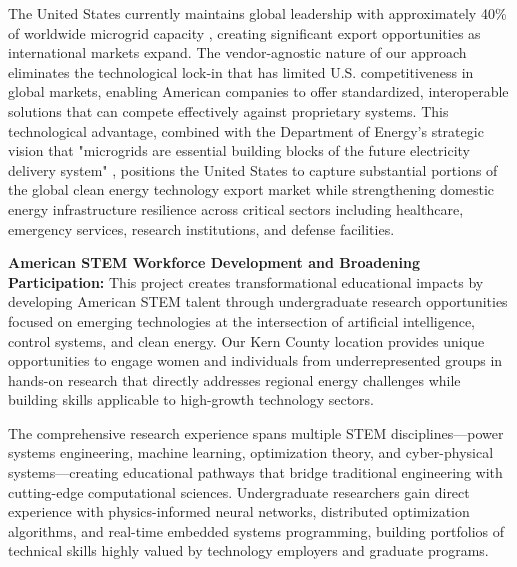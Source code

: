 \documentclass[12pt]{article}
\begin{document}
The United States currently maintains global leadership with approximately 40\% of worldwide microgrid capacity \cite{chen2018review}, creating significant export opportunities as international markets expand. The vendor-agnostic nature of our approach eliminates the technological lock-in that has limited U.S. competitiveness in global markets, enabling American companies to offer standardized, interoperable solutions that can compete effectively against proprietary systems. This technological advantage, combined with the Department of Energy's strategic vision that "microgrids are essential building blocks of the future electricity delivery system" \cite{doe2022strategy}, positions the United States to capture substantial portions of the global clean energy technology export market while strengthening domestic energy infrastructure resilience across critical sectors including healthcare, emergency services, research institutions, and defense facilities.

\textbf{American STEM Workforce Development and Broadening Participation:} This project creates transformational educational impacts by developing American STEM talent through undergraduate research opportunities focused on emerging technologies at the intersection of artificial intelligence, control systems, and clean energy. Our Kern County location provides unique opportunities to engage women and individuals from underrepresented groups in hands-on research that directly addresses regional energy challenges while building skills applicable to high-growth technology sectors.

The comprehensive research experience spans multiple STEM disciplines---power systems engineering, machine learning, optimization theory, and cyber-physical systems---creating educational pathways that bridge traditional engineering with cutting-edge computational sciences. Undergraduate researchers gain direct experience with physics-informed neural networks, distributed optimization algorithms, and real-time embedded systems programming, building portfolios of technical skills highly valued by technology employers and graduate programs.





\end{document}
